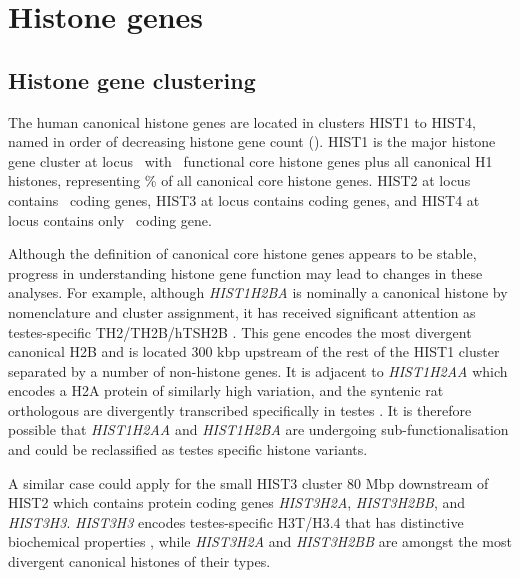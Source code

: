 \section{Histone genes}

  \subsection{Histone gene clustering}
    The human canonical histone genes are located in clusters HIST1 to HIST4,
    named in order of decreasing histone gene count ().
    HIST1 is the major histone gene cluster at locus~\HISTOneLocus{}
    with \CodingGenesInHISTOne{}~functional core histone genes plus all canonical H1 histones,
    representing
     \result{}\%
    of all canonical core histone genes.
    HIST2 at locus~\HISTTwoLocus{} contains \CodingGenesInHISTTwo{}~coding genes,
    HIST3 at locus \HISTThreeLocus{} contains \CodingGenesInHISTThree{} coding genes,
    and HIST4 at locus \HISTFourLocus{} contains only \CodingGenesInHISTFour{}~coding gene.

    Although the definition of canonical core histone genes appears to be stable,
    progress in understanding histone gene function may lead to changes in these analyses.
    For example, although \textit{HIST1H2BA} is nominally a canonical histone
    by nomenclature and cluster assignment,
    it has received significant attention as testes-specific TH2/TH2B/hTSH2B \citep{Zalensky2002,LiAusio2005,Shinagawa2014}.
    This gene encodes the most divergent canonical H2B
    and is located 300 kbp upstream of the rest of the HIST1 cluster
    separated by a number of non-histone genes.
    It is adjacent to \textit{HIST1H2AA} which encodes a H2A protein of similarly high variation,
    and the syntenic rat orthologous are divergently transcribed specifically in testes \citep{HuhChae1991}.
    It is therefore possible that \textit{HIST1H2AA} and \textit{HIST1H2BA}
    are undergoing sub-functionalisation and could be reclassified
    as testes specific histone variants.

    \label{sec:hist3h3}
    A similar case could apply for the small HIST3 cluster 80 Mbp downstream of HIST2
    which contains protein coding genes \textit{HIST3H2A}, \textit{HIST3H2BB}, and \textit{HIST3H3}.
    \textit{HIST3H3} encodes testes-specific H3T/H3.4
    that has distinctive biochemical properties \citep{WittExpCellRes1996,KurumizakaCOSB2013},
    while \textit{HIST3H2A} and \textit{HIST3H2BB} are amongst the most divergent canonical histones of their types.


